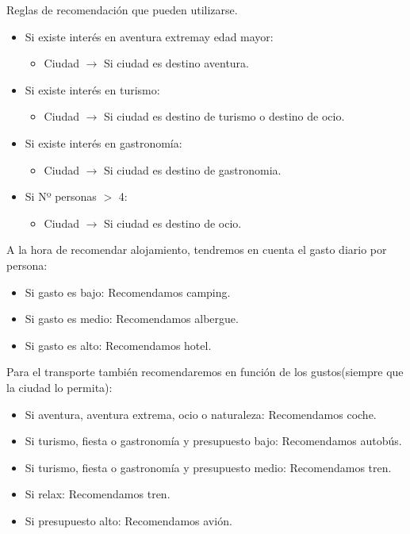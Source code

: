 \documentclass[11pt, a4paper, spanish, openright, twoside]{book}
\begin{document}
\begin{section}{Reglas de recomendación que pueden utilizarse.}
\begin{itemize}
\begin{itemize}
						\end{itemize}
					\item Si existe interés en aventura extremay edad mayor:
						\begin{itemize}
							\item Ciudad $\rightarrow$  Si ciudad es destino aventura.
						\end{itemize}
					\item Si existe interés en turismo:
						\begin{itemize}
							\item Ciudad $\rightarrow$  Si ciudad es destino de turismo o destino de ocio.
						\end{itemize}
					\item Si existe interés en gastronomía:
						\begin{itemize}
							\item Ciudad $\rightarrow$  Si ciudad es destino de gastronomia.
						\end{itemize}
					\item Si Nº personas $>$ 4:
						\begin{itemize}
							\item Ciudad $\rightarrow$  Si ciudad es destino de ocio.
						\end{itemize}

				\end{itemize}
				
			\newpage
			A la hora de recomendar alojamiento, tendremos en cuenta el gasto diario por persona:
				\begin{itemize}
					\item Si gasto es bajo: Recomendamos camping.
					\item Si gasto es medio: Recomendamos albergue.
					\item Si gasto es alto: Recomendamos hotel.
				\end{itemize}
				
			Para el transporte también recomendaremos en función de los gustos(siempre que la ciudad lo permita):
				\begin{itemize}
					\item Si aventura, aventura extrema, ocio o naturaleza: Recomendamos coche.
					\item Si  turismo, fiesta o gastronomía y presupuesto bajo: Recomendamos autobús.
					\item Si turismo, fiesta o gastronomía y presupuesto medio: Recomendamos tren.
					\item Si relax: Recomendamos tren.
					\item Si presupuesto alto: Recomendamos avión.
				\end{itemize}
				
			
	\end{section}
\end{document}
